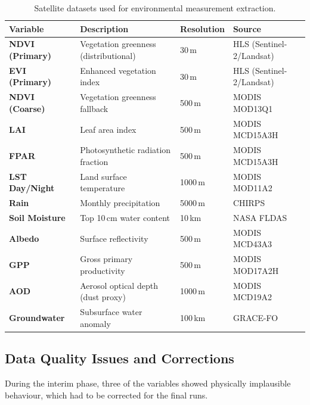 \documentclass[12pt, a4paper]{article}
\begin{document}
\begin{table}[H]
\centering
\caption{Satellite datasets used for environmental measurement extraction.}
\label{tab:datasources}
\begin{tabularx}{\textwidth}{>{\bfseries}p{2.8cm} X p{2cm} p{3.2cm}}
\toprule
Variable & Description & Resolution & Source \\
\midrule
NDVI (Primary) & Vegetation greenness (distributional) & 30\,m    & HLS (Sentinel-2/Landsat)  \\
EVI (Primary)  & Enhanced vegetation index          & 30\,m    & HLS (Sentinel-2/Landsat)  \\
NDVI (Coarse)  & Vegetation greenness fallback      & 500\,m   & MODIS MOD13Q1 \cite{didan2021}  \\
LAI         & Leaf area index                    & 500\,m   & MODIS MCD15A3H \\
FPAR        & Photosynthetic radiation fraction  & 500\,m   & MODIS MCD15A3H \\
LST Day/Night & Land surface temperature         & 1000\,m  & MODIS MOD11A2  \\
Rain        & Monthly precipitation              & 5000\,m  & CHIRPS \cite{funk2015} \\
Soil Moisture & Top 10\,cm water content          & 10\,km   & NASA FLDAS     \\
Albedo      & Surface reflectivity               & 500\,m   & MODIS MCD43A3  \\
GPP         & Gross primary productivity         & 500\,m   & MODIS MOD17A2H \\
AOD         & Aerosol optical depth (dust proxy) & 1000\,m  & MODIS MCD19A2  \\
Groundwater & Subsurface water anomaly           & 100\,km  & GRACE-FO \cite{tapley2019} \\
\bottomrule
\end{tabularx}
\end{table}

\subsection{Data Quality Issues and Corrections}

During the interim phase, three of the variables showed physically implausible behaviour, which had to be corrected for the final runs.
\end{document}

